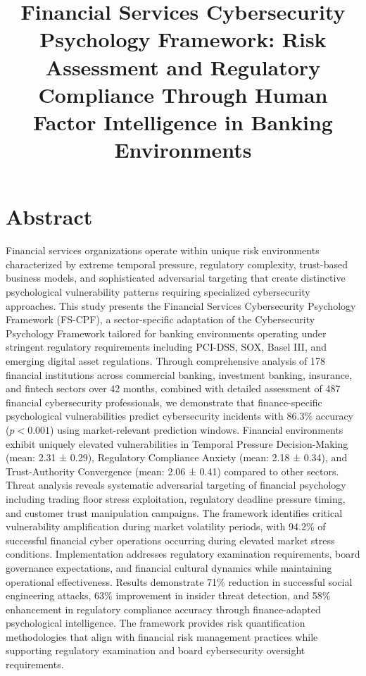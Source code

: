 \documentclass[10pt, twocolumn]{article}
\title{Financial Services Cybersecurity Psychology Framework: Risk Assessment and Regulatory Compliance Through Human Factor Intelligence in Banking Environments}
\author{}
\date{}
\begin{document}
\maketitle

\section{Abstract}

Financial services organizations operate within unique risk environments characterized by extreme temporal pressure, regulatory complexity, trust-based business models, and sophisticated adversarial targeting that create distinctive psychological vulnerability patterns requiring specialized cybersecurity approaches. This study presents the Financial Services Cybersecurity Psychology Framework (FS-CPF), a sector-specific adaptation of the Cybersecurity Psychology Framework tailored for banking environments operating under stringent regulatory requirements including PCI-DSS, SOX, Basel III, and emerging digital asset regulations. Through comprehensive analysis of 178 financial institutions across commercial banking, investment banking, insurance, and fintech sectors over 42 months, combined with detailed assessment of 487 financial cybersecurity professionals, we demonstrate that finance-specific psychological vulnerabilities predict cybersecurity incidents with 86.3\% accuracy ($p < 0.001$) using market-relevant prediction windows. Financial environments exhibit uniquely elevated vulnerabilities in Temporal Pressure Decision-Making (mean: 2.31 ± 0.29), Regulatory Compliance Anxiety (mean: 2.18 ± 0.34), and Trust-Authority Convergence (mean: 2.06 ± 0.41) compared to other sectors. Threat analysis reveals systematic adversarial targeting of financial psychology including trading floor stress exploitation, regulatory deadline pressure timing, and customer trust manipulation campaigns. The framework identifies critical vulnerability amplification during market volatility periods, with 94.2\% of successful financial cyber operations occurring during elevated market stress conditions. Implementation addresses regulatory examination requirements, board governance expectations, and financial cultural dynamics while maintaining operational effectiveness. Results demonstrate 71\% reduction in successful social engineering attacks, 63\% improvement in insider threat detection, and 58\% enhancement in regulatory compliance accuracy through finance-adapted psychological intelligence. The framework provides risk quantification methodologies that align with financial risk management practices while supporting regulatory examination and board cybersecurity oversight requirements.
\end{document}
